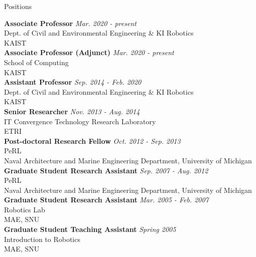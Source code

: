 \begin{rSection}{Positions}

{\bf Associate Professor} \hfill {\em Mar. 2020 - present} \\
Dept. of Civil and Environmental Engineering \& KI Robotics\\
\acf{KAIST}\\


{\bf Associate Professor (Adjunct)} \hfill {\em Mar. 2020 - present} \\
School of Computing\\
\acf{KAIST}\\

{\bf Assistant Professor} \hfill {\em Sep. 2014 - Feb. 2020} \\
Dept. of Civil and Environmental Engineering \& KI Robotics\\
\acf{KAIST}\\

{\bf Senior Researcher} \hfill {\em Nov. 2013 - Aug. 2014} \\
IT Convergence Technology Research Laboratory\\
\acf{ETRI}\\

{\bf Post-doctoral Research Fellow} \hfill {\em Oct. 2012 - Sep. 2013} \\
\acf{PeRL}\\
Naval Architecture and Marine Engineering Department, University of Michigan\\

{\bf Graduate Student Research Assistant} \hfill {\em Sep. 2007 - Aug. 2012} \\
\acf{PeRL}\\
Naval Architecture and Marine Engineering Department, University of Michigan\\

{\bf Graduate Student Research Assistant} \hfill {\em Mar. 2005 - Feb. 2007} \\
Robotics Lab\\
\acf{MAE}, \acf{SNU}\\

{\bf Graduate Student Teaching Assistant} \hfill {\em Spring 2005} \\
Introduction to Robotics\\
\acf{MAE}, \acf{SNU}\\

\end{rSection}
